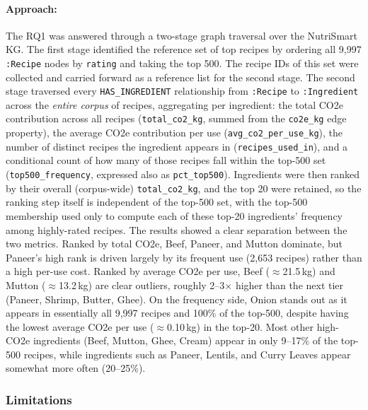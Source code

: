 \documentclass{article}
\begin{document}
\paragraph{Approach:}
The RQ1 was answered through a two-stage graph traversal over the NutriSmart KG. The first stage identified the reference set of top recipes by
ordering all 9{,}997 \texttt{:Recipe} nodes by \texttt{rating} and
taking the top 500. The recipe IDs of this set were collected and
carried forward as a reference list for the second stage. The second stage traversed every \texttt{HAS\_INGREDIENT}
relationship from \texttt{:Recipe} to \texttt{:Ingredient} across the
\emph{entire corpus} of recipes, aggregating per ingredient: the total
CO2e contribution across all recipes (\texttt{total\_co2\_kg}, summed
from the \texttt{co2e\_kg} edge property), the average CO2e
contribution per use (\texttt{avg\_co2\_per\_use\_kg}), the number of
distinct recipes the ingredient appears in
(\texttt{recipes\_used\_in}), and a conditional count of how many of
those recipes fall within the top-500 set
(\texttt{top500\_frequency}, expressed also as \texttt{pct\_top500}).
Ingredients were then ranked by their overall (corpus-wide)
\texttt{total\_co2\_kg}, and the top 20 were retained, so the
ranking step itself is independent of the top-500 set, with the
top-500 membership used only to compute each of these top-20
ingredients' frequency among highly-rated recipes. The results showed a clear separation between the two metrics. Ranked
by total CO2e, Beef, Paneer, and Mutton dominate, but Paneer's high
rank is driven largely by its frequent use (2{,}653 recipes) rather
than a high per-use cost. Ranked by average CO2e per use, Beef
($\approx$21.5\,kg) and Mutton ($\approx$13.2\,kg) are clear outliers,
roughly 2--3$\times$ higher than the next tier (Paneer, Shrimp,
Butter, Ghee). On the frequency side, Onion stands out as it appears in
essentially all 9{,}997 recipes and 100\% of the top-500, despite
having the lowest average CO2e per use ($\approx$0.10\,kg) in the
top-20. Most other high-CO2e ingredients (Beef, Mutton, Ghee, Cream)
appear in only 9--17\% of the top-500 recipes, while ingredients such
as Paneer, Lentils, and Curry Leaves appear somewhat more often
(20--25\%). 

\subsubsection*{Limitations}
\end{document}
